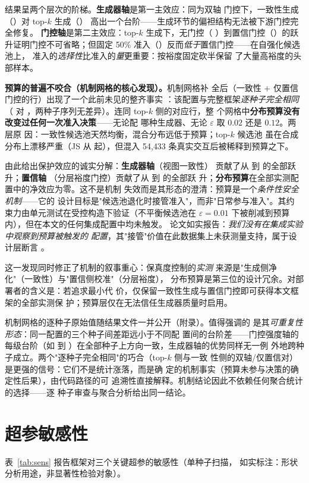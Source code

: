 结果呈两个层次的阶梯。\textbf{生成器轴}是第一主效应：同为双轴
门控下，一致性生成（\AblFull{}）对 top-$k$ 生成（\AblTopk{}）
高出一个台阶——生成环节的偏袒结构无法被下游门控完全修复。
\textbf{门控轴}是第二主效应：top-$k$ 生成下，无门控（\AblNaive{}
）到置信门控（\AblNoDist{}）的跃升证明门控不可省略；但固定 50\%
准入（\AblFix{}）反而\emph{低于}置信门控——在自强化候选池上，
准入的\emph{选择性}比准入的\emph{量}更重要：按裕度固定砍半保留
了大量高裕度的头部样本。

\textbf{预算的普遍不咬合（机制网格的核心发现）。}机制网格补
全后（一致性 $+$ 仅置信门控的行）出现了一个此前未见的整齐事实
：该配置与完整框架\emph{逐种子完全相同}（\AblConsConf{} 对
\AblFull{}，两种子序列无差异）。连同 top-$k$ 侧的对应行，整
个网格中\textbf{分布预算没有改变过任何一次准入决策}——无论配
哪种生成器、无论 $\varepsilon$ 取 $0.02$ 还是 $0.12$。两层原
因：一致性候选池天然均衡，混合分布远低于预算；top-$k$ 候选池
虽在合成分布上漂移严重（JS 从 \NaiveJsFirst{} 起），但混入
54{,}433 条真实交互后被稀释到预算之下。

由此给出保护效应的诚实分解：\textbf{生成器轴}（视图一致性）
贡献了从 \AblTopk{} 到 \AblFull{} 的全部跃升；\textbf{置信轴}
（分层裕度门控）贡献了从 \AblNaive{} 到 \AblNoDist{} 的全部跃
升；\textbf{分布预算}在全部实测配置中的净效应为零。这不是机制
失效而是其形态的澄清：预算是一个\emph{条件性安全机制}——它的
设计目标是"候选池退化时接管准入"，而非"日常参与准入"。其约
束力由单元测试在受控构造下验证（不平衡候选池在 $\varepsilon=
0.01$ 下被削减到预算内），但在本文的任何集成配置中均未触发。
论文如实报告：\emph{我们没有在集成实验中观察到预算被触发的
配置}，其"接管"价值在此数据集上未获测量支持，属于设计层断言
。

这一发现同时修正了机制的叙事重心：保真度控制的\emph{实测}
来源是"生成侧净化"（一致性）与"置信侧校准"（分层裕度），
分布预算是第三位的设计冗余。对部署者的含义是：若追求最小代
价，仅保留一致性生成与置信门控即可获得本文框架的全部实测保
护；预算层仅在无法信任生成器质量时启用。

机制网格的逐种子原始值随结果文件一并公开（附录）。值得强调的
是其\emph{可重复性形态}：同一配置的三个种子间差距远小于不同配
置间的台阶差——门控强度轴的每级台阶（如 \AblNaive{} 到
\AblNoDist{}）在全部种子上方向一致，生成器轴的优势同样无一例
外地跨种子成立。两个"逐种子完全相同"的巧合（top-$k$ 侧与一致
性侧的双轴/仅置信对）是更强的信号：它们不是统计涨落，而是确
定的机制事实（预算未参与决策的确定性后果），由代码路径的可
追溯性直接解释。机制结论因此不依赖任何聚合统计的选择——逐
种子审查与聚合分析给出同一结论。

\section{超参敏感性}
表~\ref{tab:sens} 报告框架对三个关键超参的敏感性（单种子扫描，
如实标注：形状分析用途，非显著性检验对象）。

